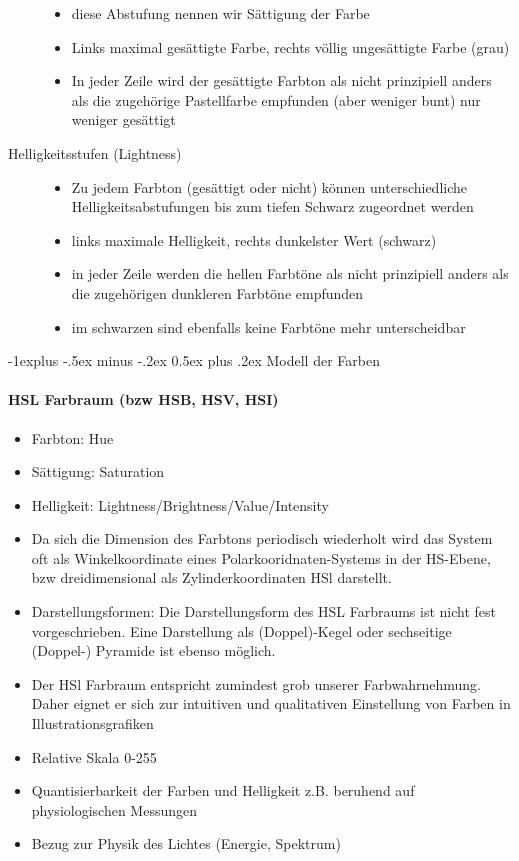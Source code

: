 \documentclass[10pt,landscape]{article}
\makeatletter
\renewcommand{\subsection}{\@startsection{subsection}{2}{0mm}%
                                {-1explus -.5ex minus -.2ex}%
                                {0.5ex plus .2ex}%
                                {\normalfont\normalsize\bfseries}}
\makeatother
\begin{document}
\begin{multicols}{3}
\begin{description}
\begin{itemize}
            \item diese Abstufung nennen wir Sättigung der Farbe
            \item Links maximal gesättigte Farbe, rechts völlig ungesättigte Farbe (grau)
            \item In jeder Zeile wird der gesättigte Farbton als nicht prinzipiell anders als die zugehörige Pastellfarbe empfunden (aber weniger bunt) nur weniger gesättigt
          \end{itemize}
    \item[Helligkeitsstufen (Lightness)]
          \begin{itemize}
            \item  Zu jedem Farbton (gesättigt oder nicht) können unterschiedliche Helligkeitsabstufungen bis zum tiefen Schwarz zugeordnet werden
            \item links maximale Helligkeit, rechts dunkelster Wert (schwarz)
            \item in jeder Zeile werden die hellen Farbtöne als nicht prinzipiell anders als die zugehörigen dunkleren Farbtöne empfunden
            \item im schwarzen sind ebenfalls keine Farbtöne mehr unterscheidbar
          \end{itemize}
  \end{description}
  
  \subsection{Modell der Farben}
  \paragraph{HSL Farbraum (bzw HSB, HSV, HSI)}
  \begin{itemize}
    \item Farbton: Hue
    \item Sättigung: Saturation
    \item Helligkeit: Lightness/Brightness/Value/Intensity
    \item Da sich die Dimension des Farbtons periodisch wiederholt wird das System oft als Winkelkoordinate eines Polarkooridnaten-Systems in der HS-Ebene, bzw dreidimensional als Zylinderkoordinaten HSl darstellt.
    \item Darstellungsformen: Die Darstellungsform des HSL Farbraums ist nicht fest vorgeschrieben. Eine Darstellung als (Doppel)-Kegel oder sechseitige (Doppel-) Pyramide ist ebenso möglich.
    \item Der HSl Farbraum entspricht zumindest grob unserer Farbwahrnehmung. Daher eignet er sich zur intuitiven und qualitativen Einstellung von Farben in Illustrationsgrafiken
    \item Relative Skala 0-255
    \item Quantisierbarkeit der Farben und Helligkeit z.B. beruhend auf physiologischen Messungen
    \item Bezug zur Physik des Lichtes (Energie, Spektrum)
  \end{itemize}

\end{multicols}
\end{document}
